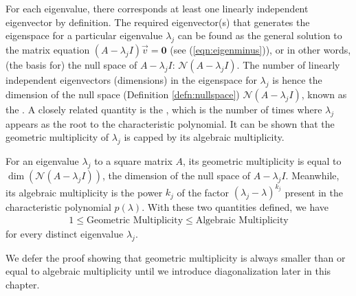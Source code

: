 For each eigenvalue, there corresponds at least one linearly independent eigenvector by definition. The required eigenvector(s) that generates the eigenspace for a particular eigenvalue $\lambda_j$ can be found as the general solution to the matrix equation $(A - \lambda_j I)\vec{v} = \textbf{0}$ (see (\ref{eqn:eigenminus})), or in other words, (the basis for) the null space of $A - \lambda_j I$: $\mathcal{N}(A-\lambda_j I)$. The number of linearly independent eigenvectors (dimensions) in the eigenspace for $\lambda_j$ is hence the dimension of the null space (Definition \ref{defn:nullspace}) $\mathcal{N}(A-\lambda_j I)$, known as the . A closely related quantity is the , which is the number of times where $\lambda_j$ appears as the root to the characteristic polynomial. It can be shown that the geometric multiplicity of $\lambda_j$ is capped by its algebraic multiplicity.
\begin{thm}
\label{thm:geolessalgebra}
For an eigenvalue $\lambda_j$ to a square matrix $A$, its geometric multiplicity is equal to $\dim(\mathcal{N}(A-\lambda_j I))$, the dimension of the null space of $A-\lambda_j I$. Meanwhile, its algebraic multiplicity is the power $k_j$ of the factor $(\lambda_j - \lambda)^{k_j}$ present in the characteristic polynomial $p(\lambda)$. With these two quantities defined, we have
\begin{align*}
1 \leq \text{Geometric Multiplicity} \leq \text{Algebraic Multiplicity}
\end{align*}
for every distinct eigenvalue $\lambda_j$.
\end{thm}
We defer the proof showing that geometric multiplicity is always smaller than or equal to algebraic multiplicity until we introduce diagonalization later in this chapter.

